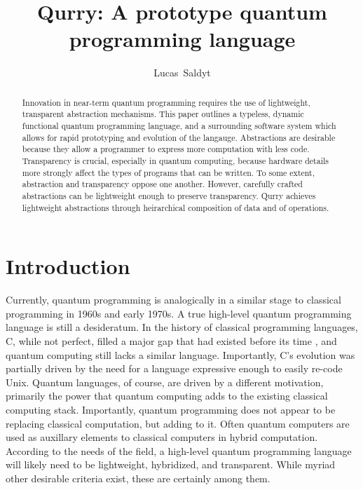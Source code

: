 \documentclass[a4paper,twocolumn,11pt,accepted=2017-05-09]{quantumarticle}
\begin{document}
\title{Qurry: A prototype quantum programming language}

\author{Lucas~Saldyt}
\maketitle

\begin{abstract}
    Innovation in near-term quantum programming requires the use of lightweight, transparent abstraction mechanisms.
    This paper outlines a typeless, dynamic functional quantum programming language, and a surrounding software system which allows for rapid prototyping and evolution of the langauge.
    Abstractions are desirable because they allow a programmer to express more computation with less code.
    Transparency is crucial, especially in quantum computing, because hardware details more strongly affect the types of programs that can be written.
    To some extent, abstraction and transparency oppose one another.
    However, carefully crafted abstractions can be lightweight enough to preserve transparency.
    Qurry achieves lightweight abstractions through heirarchical composition of data and of operations.
\end{abstract}

\section{Introduction}

Currently, quantum programming is analogically in a similar stage to classical programming in 1960s and early 1970s. 
A true high-level quantum programming language is still a desideratum.
In the history of classical programming languages, C, while not perfect, filled a major gap that had existed before its time \cite{kernighan2006c}, and quantum computing still lacks a similar language.
Importantly, C's evolution was partially driven by the need for a language expressive enough to easily re-code Unix.
Quantum languages, of course, are driven by a different motivation, primarily the power that quantum computing adds to the existing classical computing stack.
Importantly, quantum programming does not appear to be replacing classical computation, but adding to it.
Often quantum computers are used as auxillary elements to classical computers in hybrid computation.
According to the needs of the field, a high-level quantum programming language will likely need to be lightweight, hybridized, and transparent. While myriad other desirable criteria exist, these are certainly among them.
\end{document}
